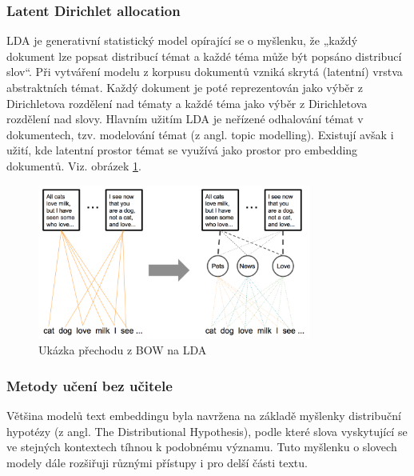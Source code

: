 \documentclass[thesis=M,czech]{FITthesis}[2019/12/23]
\begin{document}
\subsubsection*{Latent Dirichlet allocation}
LDA je generativní statistický model opírající se o myšlenku, že „každý dokument lze popsat distribucí témat a každé téma může být popsáno distribucí slov“. Při vytváření modelu z korpusu dokumentů vzniká skrytá (latentní) vrstva abstraktních témat. Každý dokument je poté reprezentován jako výběr z Dirichletova rozdělení nad tématy a každé téma jako výběr z Dirichletova rozdělení nad slovy. Hlavním užitím LDA je neřízené odhalování témat v dokumentech, tzv. modelování témat (z angl. topic modelling). Existují avšak i užití, kde latentní prostor témat se využívá jako prostor pro embedding dokumentů. Viz. obrázek \ref{fig:palachy2019LDA}.
\begin{figure}\centering
	\includegraphics[width=0.8\textwidth]{images/palachy2019/palachy2019_LDA.png}
	\caption{Ukázka přechodu z BOW na LDA\cite{palachy2019}}\label{fig:palachy2019LDA}
\end{figure}

\newpage
\subsubsection{Metody učení bez učitele}
Většina modelů text embeddingu byla navržena na základě myšlenky distribuční hypotézy (z angl. The Distributional Hypothesis), podle které slova vyskytující se ve stejných kontextech tíhnou k podobnému významu. Tuto myšlenku o slovech modely dále rozšiřuji různými přístupy i pro delší části textu.
\end{document}
